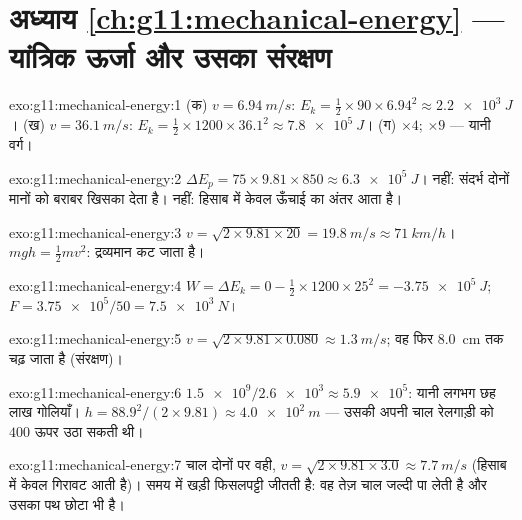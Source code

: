\section*{अध्याय \ref{ch:g11:mechanical-energy} --- यांत्रिक ऊर्जा और उसका संरक्षण}

\begin{solution}{exo:g11:mechanical-energy:1}
(क) $v = \qty{6.94}{m/s}$: $E_k = \tfrac12 \times 90 \times 6.94^2 \approx \qty{2.2e3}{J}$।
(ख) $v = \qty{36.1}{m/s}$: $E_k = \tfrac12 \times 1200 \times 36.1^2 \approx \qty{7.8e5}{J}$।
(ग) $\times 4$; $\times 9$ --- यानी वर्ग।
\end{solution}

\begin{solution}{exo:g11:mechanical-energy:2}
$\Delta E_p = 75 \times 9.81 \times 850 \approx \qty{6.3e5}{J}$। नहीं: संदर्भ दोनों मानों को बराबर खिसका देता है। नहीं: हिसाब में केवल
ऊँचाई का अंतर आता है।
\end{solution}

\begin{solution}{exo:g11:mechanical-energy:3}
$v = \sqrt{2 \times 9.81 \times 20} = \qty{19.8}{m/s} \approx
\qty{71}{km/h}$। $mgh = \tfrac12 mv^2$: द्रव्यमान कट जाता है।
\end{solution}

\begin{solution}{exo:g11:mechanical-energy:4}
$W = \Delta E_k = 0 - \tfrac12 \times 1200 \times 25^2 =
\qty{-3.75e5}{J}$; $F = \num{3.75e5}/50 = \qty{7.5e3}{N}$।
\end{solution}

\begin{solution}{exo:g11:mechanical-energy:5}
$v = \sqrt{2 \times 9.81 \times 0.080} \approx \qty{1.3}{m/s}$; वह फिर \qty{8.0}{cm} तक चढ़ जाता है (संरक्षण)।
\end{solution}

\begin{solution}{exo:g11:mechanical-energy:6}
$\num{1.5e9}/\num{2.6e3} \approx \num{5.9e5}$: यानी लगभग छह लाख गोलियाँ। $h = 88.9^2/(2 \times 9.81) \approx \qty{4.0e2}{m}$ --- उसकी अपनी चाल रेलगाड़ी को
$400$  ऊपर उठा सकती थी।
\end{solution}

\begin{solution}{exo:g11:mechanical-energy:7}
चाल दोनों पर वही, $v = \sqrt{2 \times 9.81 \times 3.0} \approx \qty{7.7}{m/s}$ (हिसाब में केवल गिरावट आती है)। समय में खड़ी
फिसलपट्टी जीतती है: वह तेज़ चाल जल्दी पा लेती है और उसका पथ छोटा भी है।
\end{solution}

